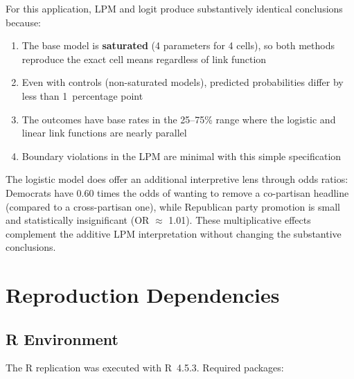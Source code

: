 \documentclass[12pt, a4paper]{article}
\renewcommand\_{\textunderscore\hspace{0pt}}
\begin{document}
For this application, LPM and logit produce substantively identical conclusions because:
\begin{enumerate}[nosep]
  \item The base model is \textbf{saturated} (4 parameters for 4 cells), so both methods reproduce the exact cell means regardless of link function
  \item Even with controls (non-saturated models), predicted probabilities differ by less than 1~percentage point
  \item The outcomes have base rates in the 25--75\% range where the logistic and linear link functions are nearly parallel
  \item Boundary violations in the LPM are minimal with this simple specification
\end{enumerate}

The logistic model does offer an additional interpretive lens through odds ratios: Democrats have 0.60 times the odds of wanting to remove a co-partisan headline (compared to a cross-partisan one), while Republican party promotion is small and statistically insignificant (OR $\approx$ 1.01). These multiplicative effects complement the additive LPM interpretation without changing the substantive conclusions.

\section{Reproduction Dependencies}

\subsection{R Environment}
The R replication was executed with R~4.5.3. Required packages:
\end{document}
